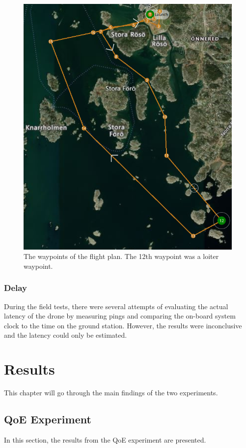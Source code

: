 \documentclass[nofilelist]{cslthse-msc}
\begin{document}
\begin{figure}[!hbt]
   \centering
   \includegraphics[scale=0.4]{images/flight-plan.png} 
   \caption{The waypoints of the flight plan. The 12th waypoint was a loiter waypoint.}
   \label{fig:flight-plan}
\end{figure}

\subsection{Delay}
During the field tests, there were several attempts of evaluating the actual latency of the drone by measuring pings and comparing the on-board system clock to the time on the ground station. However, the results were inconclusive and the latency could only be estimated.

\chapter{Results}
This chapter will go through the main findings of the two experiments.

\section{QoE Experiment}
In this section, the results from the QoE experiment are presented.  
\end{document}
